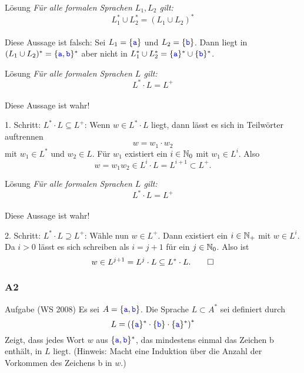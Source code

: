 \begin{frame}[t]{Lösung}
	\textit{Für alle formalen Sprachen $L_1 , L_2$ gilt: 
		$$L_1^\ast \cup L_2^\ast = (L_1 \cup L_2 )^\ast$$ } \\[2em] \pause
	Diese Aussage ist falsch: Sei $L_1 = \{\word a\}$ und $L_2 = \{\word b\}$. Dann liegt  in $(L_1 \cup L_2 )^\ast = \{\word a, \word b\}^\ast$ aber nicht in $L_1^\ast \cup L_2^\ast = \{\word a\}^\ast \cup \{\word b\}^\ast$.
\end{frame}

\begin{frame}[t]{Lösung}
	\textit{Für alle formalen Sprachen $L$ gilt: 
		$$L^\ast \cdot L = L^+ $$ } \\[1em] \pause
	Diese Aussage ist wahr! 
	\begin{block}{1. Schritt: $L^\ast \cdot L \subseteq L^+$:} \pause
	Wenn $w \in L^\ast \cdot L$ liegt, dann lässt es sich in Teilwörter auftrennen $$ w = w_1 \cdot w_2$$ mit $w_1 \in L^\ast$ und $w_2 \in L$. Für $w_1$ existiert ein $i \in \N_0$ mit $w_1 \in L^i$. Also $$w = w_1 w_2 \in L^i \cdot L = L^{i+1} \subset L^+.$$
	\end{block}
\end{frame}

\begin{frame}[t]{Lösung}
	\textit{Für alle formalen Sprachen $L$ gilt: 
		$$L^\ast \cdot L = L^+ $$ } \\[1em] 
	Diese Aussage ist wahr! 
	\begin{block}{2. Schritt: $L^\ast \cdot L \supseteq L^+$:} \pause
	Wähle nun $w \in L^+$. Dann existiert ein $i \in \N_+$ mit $w \in L^i$. Da $i > 0$ lässt es sich schreiben als $i = j + 1$ für ein $j \in \N_0$. Also ist $$w \in L^{j+1} = L^j \cdot L \subset L^\ast \cdot L. \qed$$
	\end{block}
\end{frame}

\subsubsection{A2}
\begin{frame}{Aufgabe (WS 2008) }
	Es sei $A = \{\word a, \word b\}$. Die Sprache $L \subset A^\ast$ sei definiert durch $$L = \left(\{\word a\}^\ast \cdot \{\word b\} \cdot \{\word a\}^\ast \right)^\ast$$
	Zeigt, dass jedes Wort $w$ aus $\{\word a, \word b\}^\ast$, das mindestens einmal das Zeichen
	\word b enthält, in $L$ liegt. (Hinweis: Macht eine Induktion über die Anzahl der
	Vorkommen des Zeichens \word b in $w$.)
\end{frame}

